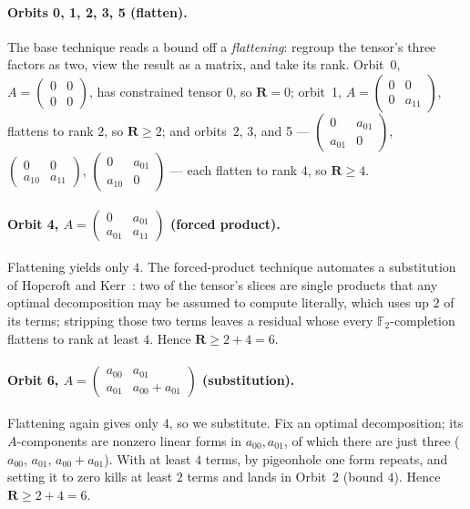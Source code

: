 \documentclass[11pt]{article}
\theoremstyle{definition}
\newcommand{\F}{\mathbb{F}}
\newcommand{\R}{\mathbf{R}}
\begin{document}
\paragraph{Orbits 0, 1, 2, 3, 5 (flatten).} The base technique reads a bound off a
\emph{flattening}: regroup the tensor's three factors as two, view the result as a
matrix, and take its rank. Orbit~0, $A=\left(
  \begin{smallmatrix}0&0\\0&0
\end{smallmatrix}\right)$,
has constrained tensor $0$, so $\R=0$; orbit~1, $A=\left(
  \begin{smallmatrix}0&0\\0&a_{11}
\end{smallmatrix}\right)$,
flattens to rank $2$, so $\R\ge2$; and orbits~2, 3, and 5 ---
$\left(
  \begin{smallmatrix}0&a_{01}\\a_{01}&0
\end{smallmatrix}\right)$,
$\left(
  \begin{smallmatrix}0&0\\a_{10}&a_{11}
\end{smallmatrix}\right)$,
$\left(
  \begin{smallmatrix}0&a_{01}\\a_{10}&0
\end{smallmatrix}\right)$ --- each flatten
to rank $4$, so $\R\ge4$.

\paragraph{Orbit 4, $A=\left(
    \begin{smallmatrix}0&a_{01}\\a_{01}&a_{11}
\end{smallmatrix}\right)$ (forced product).}
Flattening yields only $4$. The forced-product technique automates a substitution of
Hopcroft and Kerr~\cite{hopcroft1971minimizing}: two of the tensor's slices are single
products that any optimal decomposition may be assumed to compute literally, which uses
up $2$ of its terms; stripping those two terms leaves a residual whose every
$\F_2$-completion flattens to rank at least $4$. Hence $\R\ge 2+4=6$.

\paragraph{Orbit 6, $A=\left(
    \begin{smallmatrix}a_{00}&a_{01}\\a_{01}&a_{00}+a_{01}
\end{smallmatrix}\right)$ (substitution).}
Flattening again gives only $4$, so we substitute. Fix an optimal decomposition; its
$A$-components are nonzero linear forms in $a_{00},a_{01}$, of which there are just
three ($a_{00}$, $a_{01}$, $a_{00}+a_{01}$). With at least $4$ terms, by pigeonhole one
form repeats, and setting it to zero kills at least $2$ terms and lands in Orbit~2
(bound $4$). Hence $\R\ge 2+4=6$.
\end{document}
